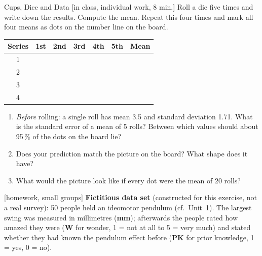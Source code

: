 \begin{uebungsblatt}{Cups, Dice and Data}
[in class, individual work, 8 min.]
Roll a die five times and write down the results. Compute the mean.
Repeat this four times and mark all four means as dots on the number line
on the board.

\begin{center}
\renewcommand{\arraystretch}{1.5}
\begin{tabular}{|c|c|c|c|c|c||c|}
\hline
\textbf{Series} & \textbf{1st} & \textbf{2nd} & \textbf{3rd} & \textbf{4th} & \textbf{5th} & \textbf{Mean} \\ \hline
1 & \hspace{8mm} & \hspace{8mm} & \hspace{8mm} & \hspace{8mm} & \hspace{8mm} & \hspace{18mm} \\ \hline
2 & & & & & & \\ \hline
3 & & & & & & \\ \hline
4 & & & & & & \\ \hline
\end{tabular}
\end{center}
\begin{enumerate}
  \item \emph{Before} rolling: a single roll has mean 3.5 and standard
    deviation 1.71. What is the standard error of a mean of 5 rolls?
    Between which values should about 95\,\% of the dots on the board lie?
  \item Does your prediction match the picture on the board? What shape
    does it have?
  \item What would the picture look like if every dot were the mean of 20
    rolls?
\end{enumerate}

[homework, small groups]
\textbf{Fictitious data set} (constructed for this exercise, not a real
survey): 50 people held an ideomotor pendulum (cf.\ Unit~1). The largest
swing was measured in millimetres (\textbf{mm}); afterwards the people
rated how amazed they were (\textbf{W} for wonder, 1 = not at all to
5 = very much) and stated whether they had known the pendulum effect
before (\textbf{PK} for prior knowledge, 1 = yes, 0 = no).


\end{uebungsblatt}
